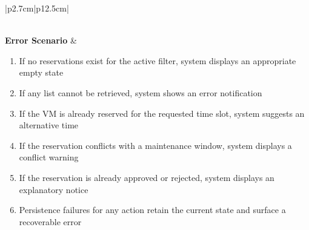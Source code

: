 \begin{table}[H]
\begin{tabular}{|p{2.7cm}|p{12.5cm}|}
\begin{minipage}[t]{\linewidth}
\begin{enumerate}[topsep=0pt,itemsep=1pt,parsep=0pt,partopsep=0pt]
            \end{enumerate}
        \end{minipage} \\
        \hline
        \textbf{Error Scenario} & \begin{minipage}[t]{\linewidth}
            \begin{enumerate}[topsep=0pt,itemsep=1pt,parsep=0pt,partopsep=0pt]
                \item If no reservations exist for the active filter, system displays an appropriate empty state
                \item If any list cannot be retrieved, system shows an error notification
                \item If the VM is already reserved for the requested time slot, system suggests an alternative time
                \item If the reservation conflicts with a maintenance window, system displays a conflict warning
                \item If the reservation is already approved or rejected, system displays an explanatory notice
                \item Persistence failures for any action retain the current state and surface a recoverable error
            \end{enumerate}
        \end{minipage} \\
        \hline
    \end{tabular}
    \label{tab:admin-vm-reservations-detailed}
\end{table}
